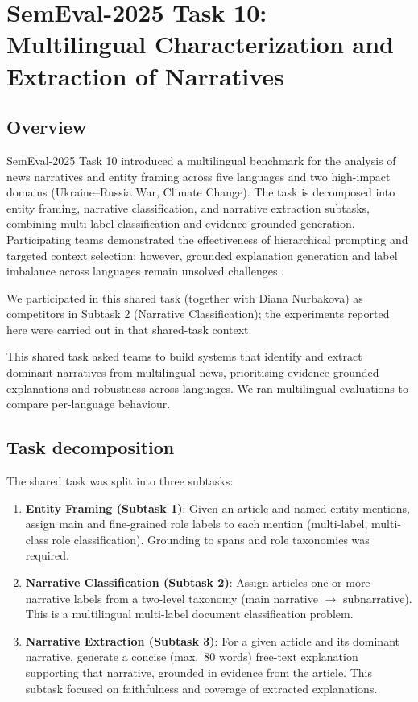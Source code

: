 \chapter{SemEval-2025 Task 10: Multilingual Characterization and Extraction of Narratives}
\label{sec:semeval25-task10}

\section{Overview}
SemEval-2025 Task 10 introduced a multilingual benchmark for the analysis of news narratives and entity framing across five languages and two high-impact domains (Ukraine–Russia War, Climate Change). The task is decomposed into entity framing, narrative classification, and narrative extraction subtasks, combining multi-label classification and evidence-grounded generation. Participating teams demonstrated the effectiveness of hierarchical prompting and targeted context selection; however, grounded explanation generation and label imbalance across languages remain unsolved challenges \cite{Piskorski2025, Fane2025, Singh2025, Fenu2025}.

We participated in this shared task (together with Diana Nurbakova) as competitors in Subtask 2 (Narrative Classification); the experiments reported here were carried out in that shared-task context.

This shared task asked teams to build systems that identify and extract dominant narratives from multilingual news, prioritising evidence-grounded explanations and robustness across languages. We ran multilingual evaluations to compare per-language behaviour.

\section{Task decomposition}
The shared task was split into three subtasks:
\begin{enumerate}
  \item \textbf{Entity Framing (Subtask 1)}: Given an article and named-entity mentions, assign main and fine-grained role labels to each mention (multi-label, multi-class role classification). Grounding to spans and role taxonomies was required. \cite{Piskorski2025}
  \item \textbf{Narrative Classification (Subtask 2)}: Assign articles one or more narrative labels from a two-level taxonomy (main narrative $\rightarrow$ subnarrative). This is a multilingual multi-label document classification problem. \cite{Piskorski2025}
  \item \textbf{Narrative Extraction (Subtask 3)}: For a given article and its dominant narrative, generate a concise (max.~80 words) free-text explanation supporting that narrative, grounded in evidence from the article. This subtask focused on faithfulness and coverage of extracted explanations. \cite{Piskorski2025}
\end{enumerate}

